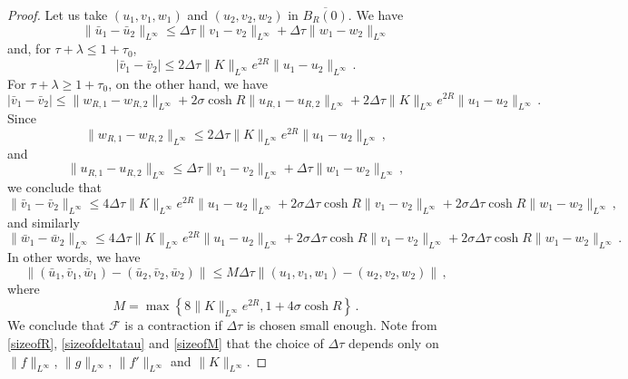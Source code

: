 \documentclass[10pt]{amsart}
\newcommand{\cF}{\mathcal{F}}
\newcommand{\rig}{R}
\begin{document}
\begin{proof}
Let us take $(u_1,v_1,w_1)$ and $(u_2,v_2,w_2)$ in $\overline{B_R(0)}$. We have
\begin{equation}
\| \bar{u}_1 - \bar{u}_2 \|_{L^\infty} \leq \Delta \tau \| v_1 - v_2 \|_{L^\infty} + \Delta \tau \| w_1 - w_2 \|_{L^\infty}
\end{equation}
and, for $\tau + \lambda \leq 1 + \tau_0$,
\begin{equation}
| \bar{v}_1 - \bar{v}_2 | \leq 2 \Delta \tau  \| K \|_{L^\infty} e^{2R} \| u_1 - u_2 \|_{L^\infty} \, .
\end{equation}
For $ \tau + \lambda\geq 1 + \tau_0$, on the other hand, we have
\begin{equation}
| \bar{v}_1 - \bar{v}_2 | \leq \| w_{\rig,1} - w_{\rig,2} \|_{L^\infty} + 2 \sigma \cosh R \| u_{\rig,1} - u_{\rig,2} \|_{L^\infty} + 2 \Delta \tau  \| K \|_{L^\infty} e^{2R} \| u_1 - u_2 \|_{L^\infty} \, .
\end{equation}
Since
\begin{equation}
\| w_{\rig,1} - w_{\rig,2} \|_{L^\infty} \leq 2 \Delta \tau  \| K \|_{L^\infty} e^{2R} \| u_1 - u_2 \|_{L^\infty} \, ,
\end{equation}
and
\begin{equation}
\| u_{\rig,1} - u_{\rig,2} \|_{L^\infty} \leq \Delta \tau \| v_1 - v_2 \|_{L^\infty} + \Delta \tau \| w_1 - w_2 \|_{L^\infty} \, ,
\end{equation}
we conclude that
\begin{equation}
\| \bar{v}_1 - \bar{v}_2 \|_{L^\infty} \leq 4 \Delta \tau  \| K \|_{L^\infty} e^{2R} \| u_1 - u_2 \|_{L^\infty} + 2\sigma \Delta \tau \cosh R \| v_1 - v_2 \|_{L^\infty} + 2\sigma \Delta \tau \cosh R \| w_1 - w_2 \|_{L^\infty}  \, ,
\end{equation}
and similarly
\begin{equation}
\| \bar{w}_1 - \bar{w}_2 \|_{L^\infty} \leq 4 \Delta \tau  \| K \|_{L^\infty} e^{2R} \| u_1 - u_2 \|_{L^\infty} + 2\sigma \Delta \tau \cosh R \| v_1 - v_2 \|_{L^\infty} + 2\sigma \Delta \tau \cosh R \| w_1 - w_2 \|_{L^\infty}  \, .
\end{equation}
In other words, we have
\begin{equation}
\| (\bar{u}_1,\bar{v}_1,\bar{w}_1) - (\bar{u}_2,\bar{v}_2,\bar{w}_2) \| \leq  M \Delta \tau \| (u_1, v_1, w_1) - (u_2, v_2, w_2) \|  \, ,
\end{equation}
where
\begin{equation} \label{sizeofM}
M = \max \left\{ 8 \| K \|_{L^\infty} e^{2R}, 1 + 4 \sigma \cosh R \right\}  \, .
\end{equation}
We conclude that $\cF$ is a contraction if $\Delta \tau$ is chosen small enough. Note from \eqref{sizeofR}, \eqref{sizeofdeltatau} and \eqref{sizeofM} that the choice of $\Delta \tau$ depends only on $\| f \|_{L^\infty}$, $\| g \|_{L^\infty}$, $\| f' \|_{L^\infty}$ and $\| K \|_{L^\infty}$.


\end{proof}
\end{document}
